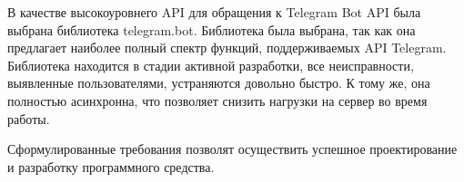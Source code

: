 В качестве высокоуровнего API для обращения к Telegram Bot API была выбрана библиотека telegram.bot. Библиотека была выбрана, так как она предлагает наиболее полный спектр функций, поддерживаемых API Telegram. Библиотека находится в стадии активной разработки, все неисправности, выявленные пользователями, устраняются довольно быстро. К тому же, она полностью асинхронна, что позволяет снизить нагрузки на сервер во время работы.

Сформулированные требования позволят осуществить успешное проектирование и разработку программного средства.

